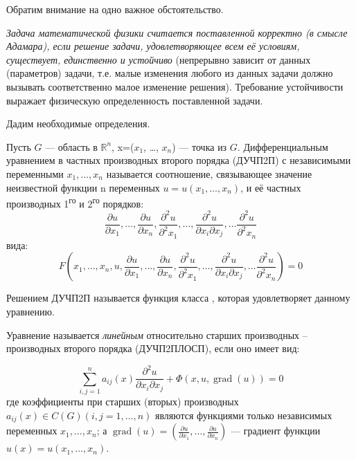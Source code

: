 \bigskip

Обратим внимание на одно важное обстоятельство.

\textsl{Задача математической физики считается поставленной корректно (в смысле Адамара), если решение задачи, удовлетворяющее всем её условиям, существует, единственно и устойчиво} (непрерывно зависит от данных (параметров) задачи, т.е. малые изменения любого из данных задачи должно вызывать соответственно малое изменение решения). Требование устойчивости выражает физическую определенность поставленной задачи.

\bigskip

Дадим необходимые определения.

\begin{definition}
Пусть $G$ --- область в $\mathbb{R}^n$, x=($x_1$, \ldots, $x_n$) --- точка из $G$. Дифференциальным уравнением в частных производных второго порядка (ДУЧП2П) с независимыми переменными $x_1, \ldots, x_n$ называется соотношение, связывающее значение неизвестной функции n переменных $u=u(x_1, \ldots, x_n)$, и её частных производных 1\textsuperscript{го} и 2\textsuperscript{го} порядков:
\[
\frac{\partial u}{\partial x_1}, \ldots, \frac{\partial u}{\partial x_n},
\frac{\partial^2 u}{\partial^2 x_1}, \ldots, \frac{\partial^2 u}{\partial x_i \partial x_j}, \ldots \frac{\partial^2 u}{\partial^2 x_n}
\] вида:
\[
F(x_1, \ldots, x_n, u, \frac{\partial u}{\partial x_1}, \ldots, \frac{\partial u}{\partial x_n},
\frac{\partial^2 u}{\partial^2 x_1}, \ldots, \frac{\partial^2 u}{\partial x_i \partial x_j}, \ldots \frac{\partial^2 u}{\partial^2 x_n})=0
\]
\end{definition}

Решением ДУЧП2П называется функция  класса , которая удовлетворяет данному уравнению.

Уравнение называется \textsl{линейным} относительно старших производных – производных второго порядка (ДУЧП2ПЛОСП), если оно имеет вид:

\[
\sum_{i,j=1}^{n} a_{ij}(x)\frac{\partial^2u}{\partial x_i \partial x_j} + \Phi(x, u, \operatorname{grad}(u)) = 0
\]
где коэффициенты при старших (вторых) производных $a_{ij}(x) \in C(G) (i, j = 1, \ldots,n)$ являются функциями только независимых переменных $x_1, \ldots, x_n$; 
а $\operatorname{grad}(u) = (\frac{\partial u}{\partial x_1}, \ldots, \frac{\partial u}{\partial x_n})$ --- градиент функции $u(x) = u(x_1, \ldots, x_n)$.

\bigskip

